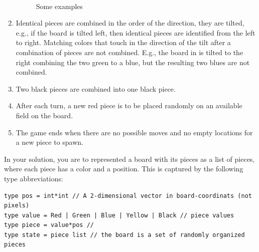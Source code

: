 \begin{enumerate}
\begin{figure}
    \\
    \caption{Some examples}
    \label{fig:2048Samples}
  \end{figure}
\item Identical pieces are combined in the order of the direction, they are tilted, e.g., if the board is tilted left, then identical pieces are identified from the left to right. Matching colors that touch in the direction of the tilt after a combination of pieces are not combined. E.g., the board in  is tilted to the right combining the two green to a blue, but the resulting two blues are not combined.
\item Two black pieces are combined into one black piece.
\item After each turn, a new red piece is to be placed randomly on an available field on the board.
\item The game ends when there are no possible moves and no empty locations for a new piece to spawn.
\end{enumerate}
In your solution, you are to represented a board with its pieces as a list of pieces, where each piece has a color and a position. This is captured by the following type abbreviations:
\begin{lstlisting}
type pos = int*int // A 2-dimensional vector in board-coordinats (not pixels)
type value = Red | Green | Blue | Yellow | Black // piece values
type piece = value*pos //
type state = piece list // the board is a set of randomly organized pieces
\end{lstlisting}
